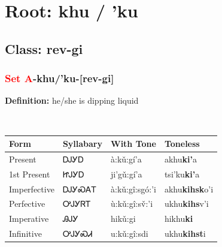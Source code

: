 \needspace{4in}
\section*{Root: khu / 'ku}
\nopagebreak
{}
\needspace{3in}
\subsection*{Class: rev-gi}
\nopagebreak
\needspace{2in}
\subsubsection*{\textcolor{Red}{Set A}{-}\textbf{khu/'ku}{-}[rev-gi]}
\nopagebreak
\textbf{Definition: } he/she is dipping liquid
\\[0.5em]
\begin{tabularx}{\textwidth}{l X X X}%
\toprule%
\textbf{Form}&\textbf{Syllabary}&\textbf{With Tone}&\textbf{Toneless}\\%
\midrule%
Present&ᎠᎫᎩᎠ&à:kǔ:gí’a&akhu\textbf{ki'}a\\%
1st Present&ᏥᎫᎩᎠ&ji’gǔ:gí’a&tsi'ku\textbf{ki'}a\\%
Imperfective&ᎠᎫᎩᏍᎪᎢ&à:kǔ:gî:sgó:’i&akhu\textbf{kihsk}o'i\\%
Perfective&ᎤᎫᎩᏒᎢ&ù:kǔ:gî:sv̌:’i&ukhu\textbf{kihs}v'i\\%
Imperative&ᎯᎫᎩ&hikǔ:gi&hikhu\textbf{ki}\\%
Infinitive&ᎤᎫᎩᏍᏗ&u:kǔ:gî:sdi&ukhu\textbf{kihst}i\\%
\bottomrule%
\end{tabularx}
\\[1em]